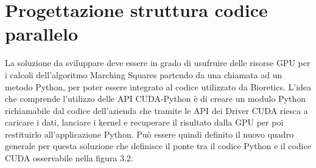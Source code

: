 \documentclass[12pt,a4paper]{report}
\begin{document}
\newpage
\section{Progettazione struttura codice parallelo}
La soluzione da sviluppare deve essere in grado di usufruire delle risorse GPU per i calcoli dell'algoritmo Marching Squares partendo da una chiamata ad un metodo Python, per poter essere integrato al codice utilizzato da Bioretics. \newline
L'idea che comprende l'utilizzo delle API CUDA-Python è di creare un modulo Python richiamabile dal codice dell'azienda che tramite le API dei Driver CUDA riesca a caricare i dati, lanciare i kernel e recuperare il risultato dalla GPU per poi restituirlo all'applicazione Python. \newline
Può essere quindi definito il nuovo quadro generale per questa soluzione che definisce il ponte tra il codice Python e il codice CUDA osservabile nella figura 3.2. \\[10pt]

\begin{figure}[H]
\centering
\begin{floatrow}[1]
\end{floatrow}
\end{figure} \newpage
\end{document}
